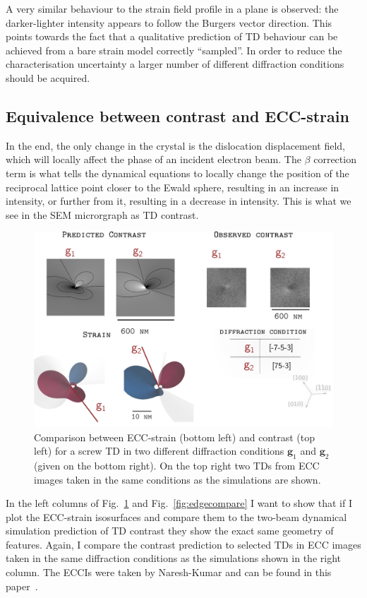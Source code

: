 A very similar behaviour to the strain field profile in a plane is observed: the darker-lighter intensity appears to follow the Burgers vector direction. This points towards the fact that a qualitative prediction of TD behaviour can be achieved from a bare strain model correctly ``sampled''. In order to reduce the characterisation uncertainty a larger number of different diffraction conditions should be acquired.


\subsection{Equivalence between contrast and ECC-strain}

In the end, the only change in the crystal is the dislocation displacement field, which will  locally affect the phase of an incident electron beam. The $\beta$ correction term is what tells the dynamical equations to locally change the position of the reciprocal lattice point closer to the Ewald sphere, resulting in an increase in intensity, or further from it, resulting in a decrease in intensity. This is what we see in the SEM microrgraph as TD contrast. 

\begin{figure}[ht]
    \centering
    \includegraphics[width=0.7\linewidth]{Figures/screwcompare.png}
    \caption[ECC-strain vs contrast for a screw TD]{  Comparison between ECC-strain (bottom left) and contrast (top left) for a screw TD in two different diffraction conditions $\textbf{g}_1$ and $\textbf{g}_2$ (given on the bottom right). On the top right two TDs from ECC images taken in the same conditions as the simulations are shown.}
    \label{fig:screwcompare}
\end{figure}


In the left columns of Fig.~\ref{fig:screwcompare} and Fig.~\ref{fig:edgecompare} I want to show that if I plot the ECC-strain isosurfaces and compare them to the two-beam dynamical simulation prediction of TD contrast they show the exact same geometry of features.  Again, I compare the contrast prediction to selected TDs in ECC images taken in the same diffraction conditions as the simulations shown in the right column.  The ECCIs were taken by Naresh-Kumar and can be found in this paper~\cite{Naresh}.

